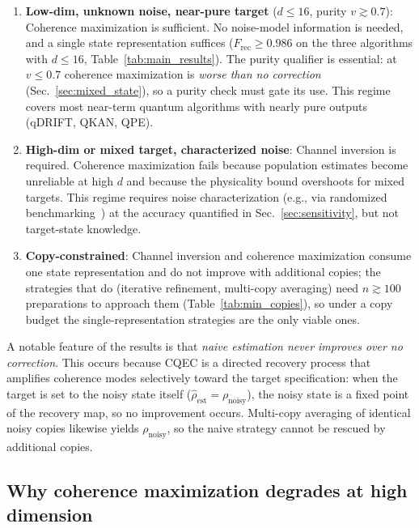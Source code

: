 \documentclass[12pt,a4paper]{article}
\newcommand{\Frec}{F_\mathrm{rec}}
\newcommand{\rhon}{\rho_\mathrm{noisy}}
\newcommand{\rhoe}{\hat{\rho}_\mathrm{est}}
\begin{document}
\begin{enumerate}
\item \textbf{Low-dim, unknown noise, near-pure target} ($d \leq 16$, purity $v \gtrsim 0.7$): Coherence maximization is sufficient.
No noise-model information is needed, and a single state representation suffices ($\Frec \geq 0.986$ on the three algorithms with $d \leq 16$, Table~\ref{tab:main_results}).
The purity qualifier is essential: at $v \leq 0.7$ coherence maximization is \emph{worse than no correction} (Sec.~\ref{sec:mixed_state}), so a purity check must gate its use.
This regime covers most near-term quantum algorithms with nearly pure outputs (qDRIFT, QKAN, QPE).

\item \textbf{High-dim or mixed target, characterized noise}: Channel inversion is required.
Coherence maximization fails because population estimates become unreliable at high $d$ and because the physicality bound overshoots for mixed targets.
This regime requires noise characterization (e.g., via randomized benchmarking~\cite{Emerson2005,Knill2008,Magesan2011}) at the accuracy quantified in Sec.~\ref{sec:sensitivity}, but not target-state knowledge.

\item \textbf{Copy-constrained}: Channel inversion and coherence maximization consume one state representation and do not improve with additional copies; the strategies that do (iterative refinement, multi-copy averaging) need $n \gtrsim 100$ preparations to approach them (Table~\ref{tab:min_copies}), so under a copy budget the single-representation strategies are the only viable ones.
\end{enumerate}

A notable feature of the results is that \emph{naive estimation never improves over no correction}.
This occurs because CQEC is a directed recovery process that amplifies coherence modes selectively toward the target specification: when the target is set to the noisy state itself ($\rhoe = \rhon$), the noisy state is a fixed point of the recovery map, so no improvement occurs.
Multi-copy averaging of identical noisy copies likewise yields $\rhon$, so the naive strategy cannot be rescued by additional copies.


\subsection{Why coherence maximization degrades at high dimension}
\label{sec:cohmax_principle}
\end{document}
